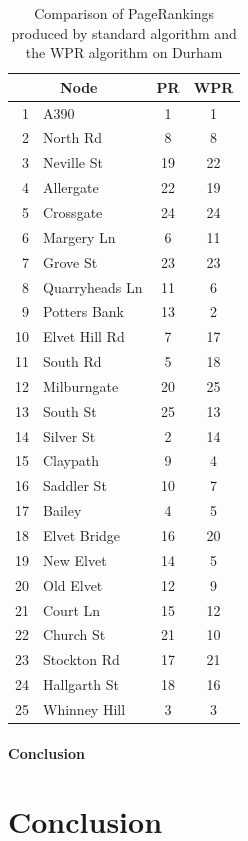 \documentclass[11pt]{report}
\begin{document}
{\begin{table}[h] \caption{Comparison of PageRankings produced by standard algorithm and the WPR algorithm on Durham}
 \centering
 \begin{tabular} {r l| c c} 
 \multicolumn{2}{c|}{Node}& PR & WPR \\ [0.5ex] 
 \hline
 1&A390&1&1\\
 2&North Rd&8&8\\
 3&Neville St&19&22\\
 4&Allergate&22&19\\
 5&Crossgate&24&24\\
 6&Margery Ln&6&11\\
 7&Grove St&23&23\\
 8&Quarryheads Ln&11&6\\
 9&Potters Bank&13&2\\
 10&Elvet Hill Rd&7&17\\
 11&South Rd&5&18\\
 12&Milburngate&20&25\\
 13&South St&25&13\\
 14&Silver St&2&14\\
 15&Claypath&9&4\\
 16&Saddler St&10&7\\
 17&Bailey&4&5\\
 18&Elvet Bridge&16&20\\
 19&New Elvet&14&5\\
 20&Old Elvet&12&9\\
 21&Court Ln&15&12\\
 22&Church St&21&10\\
 23&Stockton Rd&17&21\\
 24&Hallgarth St&18&16\\
 25&Whinney Hill&3&3\\
 
 \end{tabular}
 \label{Table:Durham comparison}
\end{table}
\FloatBarrier

\subsubsection{Conclusion} \label{sec:Durham conc}
\chapter{Conclusion} \label{chap:Conclusion}

\newpage
{}


\begin{appendices}

\end{appendices}}
\end{document}
